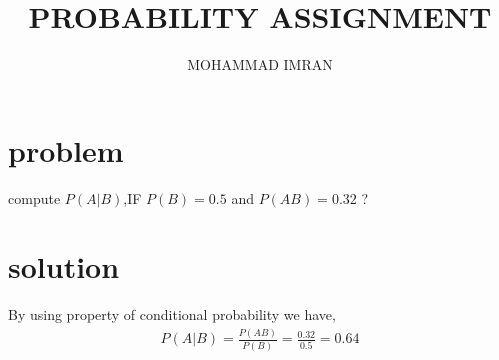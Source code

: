 \documentclass[journal,12pt,twocolumn]{article}
\title{PROBABILITY ASSIGNMENT}
\author{MOHAMMAD IMRAN}
\begin{document}
\maketitle
\bigskip

\section{problem }

compute $P(A | B)$,IF $P(B)=0.5$ and $P(AB)=0.32$ ?

\section{solution }

By using property of conditional probability we have,
\begin{align}
P(A | B)=\frac{P(AB)}{P(B)}=\frac{0.32}{0.5}=0.64
\end{align}
 
\end{document}
